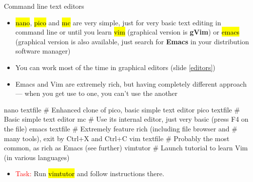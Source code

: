 \documentclass[compress, ucs, xelatex, 11pt, xcolor=svgnames, aspectratio=169,
	hyperref={
		bookmarks=true,
		unicode=true,
		colorlinks=true,
		pdftitle={Linux, command line and MetaCentrum},
		plainpages=false,
		pdfauthor={Vojtech Zeisek},
		pdfsubject={Course about use of Linux command line, writing shell scripts and using MetaCentrum of CESNET},
		pdfcreator={XeLaTeX},
		pdfkeywords={Linux, GNU, BASH, shell, command line, MetaCentrum},
		linkcolor=DarkRed, %
		anchorcolor=DarkBlue, %
		citecolor=Indigo, %
		filecolor=NavyBlue, %
		menucolor=DarkMagenta, %
		urlcolor=DarkBlue, %
		pdftex},
	url={hyphens, lowtilde} %
	]{beamer}
\renewcommand{\texttt}[1]{\hl{\ttfamily #1}}
\renewcommand{\alert}[1]{\textcolor{red}{#1}}
\begin{document}
\begin{frame}[fragile]{Command line text editors}
	\begin{itemize}
		\item \texttt{nano}, \texttt{pico} and \texttt{mc} are very simple, just for very basic text editing in command line or until you learn \texttt{vim} (graphical version is \textbf{gVim}) or \texttt{emacs} (graphical version is also available, just search for \textbf{Emacs} in your distribution software manager)
		\item You can work most of the time in graphical editors (slide \ref{editors})
		\item Emacs and Vim are extremely rich, but having completely different approach --- when you get use to one, you can't use the another
	\end{itemize}
	\vfill
	\begin{bashcode}
    nano textfile # Enhanced clone of pico, basic simple text editor
    pico textfile # Basic simple text editor
    mc # Use its internal editor, just very basic (press F4 on the file)
    emacs textfile # Extremely feature rich (including file browser and
                   # many tools), exit by Ctrl+X and Ctrl+C
    vim textfile # Probably the most common, as rich as Emacs (see further)
    vimtutor # Launch tutorial to learn Vim (in various languages)
	\end{bashcode}
	\vfill
	\begin{itemize}
		\item \alert{Task:} Run \texttt{vimtutor} and follow instructions there.
	\end{itemize}
\end{frame}
\end{document}
